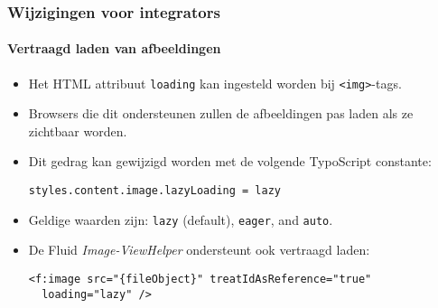 
\begin{frame}[fragile]
	\frametitle{Wijzigingen voor integrators}
	\framesubtitle{Vertraagd laden van afbeeldingen}

	\lstset{basicstyle=\smaller\ttfamily}

	\begin{itemize}
		\item Het HTML attribuut \texttt{loading} kan ingesteld worden bij \texttt{<img>}-tags.
		\item Browsers die dit ondersteunen zullen de afbeeldingen pas laden als ze zichtbaar worden.
		\item Dit gedrag kan gewijzigd worden met de volgende TypoScript constante:

\vspace{-0.4cm}
\begin{lstlisting}
styles.content.image.lazyLoading = lazy
\end{lstlisting}

		\item Geldige waarden zijn: \texttt{lazy} (default), \texttt{eager}, and \texttt{auto}.
		\item De Fluid \textit{Image-ViewHelper} ondersteunt ook vertraagd laden:

\vspace{-0.4cm}
\begin{lstlisting}
<f:image src="{fileObject}" treatIdAsReference="true"
  loading="lazy" />
\end{lstlisting}

	\end{itemize}

\end{frame}


